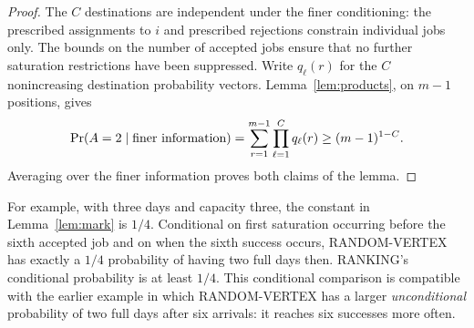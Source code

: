 \documentclass[11pt]{article}
\begin{document}
\begin{proof}
The $C$ destinations are independent under the finer conditioning:
the prescribed assignments to $i$ and prescribed rejections constrain
individual jobs only. The bounds on the number of accepted jobs ensure
that no further saturation restrictions have been suppressed. Write
$q_\ell(r)$ for the $C$ nonincreasing destination probability vectors.
Lemma~\ref{lem:products}, on $m-1$ positions, gives
\[
 \Pr(A=2\mid\hbox{finer information})
 =\sum_{r=1}^{m-1}\prod_{\ell=1}^{C}q_\ell(r)
 \geq(m-1)^{1-C}.
\]
Averaging over the finer information proves both claims of the lemma.
\end{proof}

For example, with three days and capacity three, the constant in
Lemma~\ref{lem:mark} is $1/4$. Conditional on first saturation occurring
before the sixth accepted job and on when the sixth success occurs,
RANDOM-VERTEX has exactly a $1/4$ probability of having two full days
then. RANKING's conditional probability is at least $1/4$.
This conditional comparison is compatible with the earlier example in
which RANDOM-VERTEX has a larger \emph{unconditional} probability of
two full days after six arrivals: it reaches six successes more often.
\end{document}

